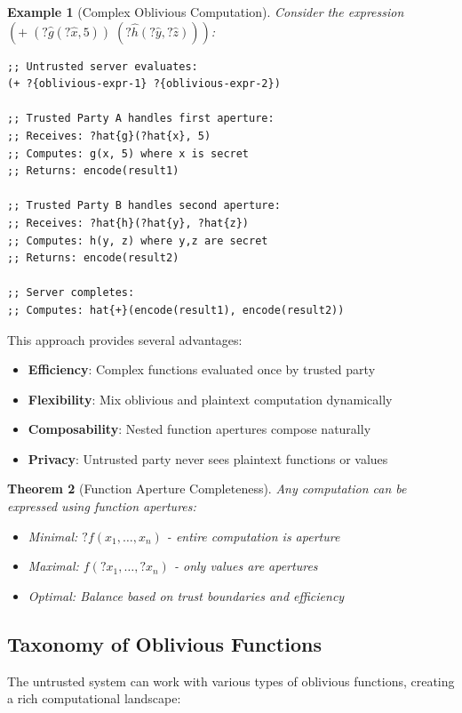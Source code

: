 \documentclass[12pt]{article}
\newtheorem{theorem}{Theorem}
\newtheorem{example}[theorem]{Example}
\begin{document}
\begin{example}[Complex Oblivious Computation]
Consider the expression $(+ \; (?\hat{g}(?\hat{x}, 5)) \; (?\hat{h}(?\hat{y}, ?\hat{z})))$:
\begin{lstlisting}
;; Untrusted server evaluates:
(+ ?{oblivious-expr-1} ?{oblivious-expr-2})

;; Trusted Party A handles first aperture:
;; Receives: ?hat{g}(?hat{x}, 5)
;; Computes: g(x, 5) where x is secret
;; Returns: encode(result1)

;; Trusted Party B handles second aperture:
;; Receives: ?hat{h}(?hat{y}, ?hat{z})  
;; Computes: h(y, z) where y,z are secret
;; Returns: encode(result2)

;; Server completes:
;; Computes: hat{+}(encode(result1), encode(result2))
\end{lstlisting}
\end{example}

This approach provides several advantages:
\begin{itemize}
    \item \textbf{Efficiency}: Complex functions evaluated once by trusted party
    \item \textbf{Flexibility}: Mix oblivious and plaintext computation dynamically
    \item \textbf{Composability}: Nested function apertures compose naturally
    \item \textbf{Privacy}: Untrusted party never sees plaintext functions or values
\end{itemize}

\begin{theorem}[Function Aperture Completeness]
Any computation can be expressed using function apertures:
\begin{itemize}
    \item Minimal: $?f(x_1, \ldots, x_n)$ - entire computation is aperture
    \item Maximal: $f(?x_1, \ldots, ?x_n)$ - only values are apertures  
    \item Optimal: Balance based on trust boundaries and efficiency
\end{itemize}
\end{theorem}

\subsection{Taxonomy of Oblivious Functions}

The untrusted system can work with various types of oblivious functions, creating a rich computational landscape:
\end{document}

